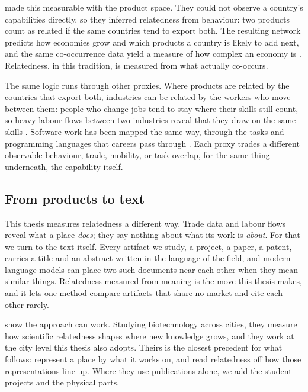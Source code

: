 \documentclass[12pt,a4paper]{article}
\begin{document}
	\citet{hidalgoProductSpaceConditions2007} made this measurable with the product
	space. They could not observe a country's capabilities directly, so they inferred
	relatedness from behaviour: two products count as related if the same countries
	tend to export both. The resulting network predicts how economies grow and which
	products a country is likely to add next, and the same co-occurrence data yield a
	measure of how complex an economy is \citep{hidalgoBuildingBlocksEconomic2009}.
	Relatedness, in this tradition, is measured from what actually co-occurs.
	
	The same logic runs through other proxies. Where products are related by the
	countries that export both, industries can be related by the workers who move
	between them: people who change jobs tend to stay where their skills still count,
	so heavy labour flows between two industries reveal that they draw on the same
	skills \citep{neffkeSkillRelatednessFirm2013, liEvaluatingPrincipleRelatedness2023}.
	Software work has been mapped the same way, through the tasks and programming
	languages that careers pass through \citep{fengBuildingBlocksSoftware}. Each proxy
	trades a different observable behaviour, trade, mobility, or task overlap, for the
	same thing underneath, the capability itself.
	
	\subsection{From products to text}
	
	This thesis measures relatedness a different way. Trade data and labour flows
	reveal what a place \textit{does}; they say nothing about what its work is
	\textit{about}. For that we turn to the text itself. Every artifact we study, a
	project, a paper, a patent, carries a title and an abstract written in the
	language of the field, and modern language models can place two such documents
	near each other when they mean similar things. Relatedness measured from meaning
	is the move this thesis makes, and it lets one method compare artifacts that share
	no market and cite each other rarely.
	
	\citet{boschmaScientificKnowledgeDynamics2014} show the approach can work.
	Studying biotechnology across cities, they measure how scientific relatedness
	shapes where new knowledge grows, and they work at the city level this thesis also
	adopts. Theirs is the closest precedent for what follows: represent a place by
	what it works on, and read relatedness off how those representations line up. Where
	they use publications alone, we add the student projects and the physical parts.
	
\end{document}
